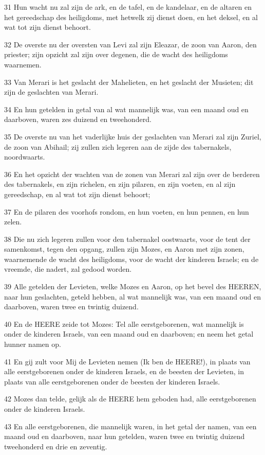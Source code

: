 \par 31 Hun wacht nu zal zijn de ark, en de tafel, en de kandelaar, en de altaren en het gereedschap des heiligdoms, met hetwelk zij dienst doen, en het deksel, en al wat tot zijn dienst behoort.
\par 32 De overste nu der oversten van Levi zal zijn Eleazar, de zoon van Aaron, den priester; zijn opzicht zal zijn over degenen, die de wacht des heiligdoms waarnemen.
\par 33 Van Merari is het geslacht der Mahelieten, en het geslacht der Musieten; dit zijn de geslachten van Merari.
\par 34 En hun getelden in getal van al wat mannelijk was, van een maand oud en daarboven, waren zes duizend en tweehonderd.
\par 35 De overste nu van het vaderlijke huis der geslachten van Merari zal zijn Zuriel, de zoon van Abihail; zij zullen zich legeren aan de zijde des tabernakels, noordwaarts.
\par 36 En het opzicht der wachten van de zonen van Merari zal zijn over de berderen des tabernakels, en zijn richelen, en zijn pilaren, en zijn voeten, en al zijn gereedschap, en al wat tot zijn dienst behoort;
\par 37 En de pilaren des voorhofs rondom, en hun voeten, en hun pennen, en hun zelen.
\par 38 Die nu zich legeren zullen voor den tabernakel oostwaarts, voor de tent der samenkomst, tegen den opgang, zullen zijn Mozes, en Aaron met zijn zonen, waarnemende de wacht des heiligdoms, voor de wacht der kinderen Israels; en de vreemde, die nadert, zal gedood worden.
\par 39 Alle getelden der Levieten, welke Mozes en Aaron, op het bevel des HEEREN, naar hun geslachten, geteld hebben, al wat mannelijk was, van een maand oud en daarboven, waren twee en twintig duizend.
\par 40 En de HEERE zeide tot Mozes: Tel alle eerstgeborenen, wat mannelijk is onder de kinderen Israels, van een maand oud en daarboven; en neem het getal hunner namen op.
\par 41 En gij zult voor Mij de Levieten nemen (Ik ben de HEERE!), in plaats van alle eerstgeborenen onder de kinderen Israels, en de beesten der Levieten, in plaats van alle eerstgeborenen onder de beesten der kinderen Israels.
\par 42 Mozes dan telde, gelijk als de HEERE hem geboden had, alle eerstgeborenen onder de kinderen Israels.
\par 43 En alle eerstgeborenen, die mannelijk waren, in het getal der namen, van een maand oud en daarboven, naar hun getelden, waren twee en twintig duizend tweehonderd en drie en zeventig.
